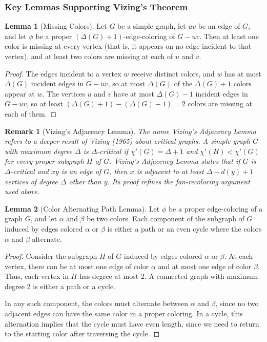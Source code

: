 \documentclass{article}
\newtheorem{remark}{Remark}
\theoremstyle{definition}
\newtheorem{lemma}{Lemma}
\begin{document}
\subsubsection{Key Lemmas Supporting Vizing's Theorem}

\begin{lemma}[Missing Colors]
Let $G$ be a simple graph, let $uv$ be an edge of $G$, and let $\phi$ be a proper $(\Delta(G) + 1)$-edge-coloring of $G - uv$. Then at least one color is missing at every vertex (that is, it appears on no edge incident to that vertex), and at least two colors are missing at each of $u$ and $v$.
\end{lemma}

\begin{proof}
The edges incident to a vertex $w$ receive distinct colors, and $w$ has at most $\Delta(G)$ incident edges in $G - uv$, so at most $\Delta(G)$ of the $\Delta(G) + 1$ colors appear at $w$. The vertices $u$ and $v$ have at most $\Delta(G) - 1$ incident edges in $G - uv$, so at least $(\Delta(G) + 1) - (\Delta(G) - 1) = 2$ colors are missing at each of them.
\end{proof}

\begin{remark}[Vizing's Adjacency Lemma]
The name \emph{Vizing's Adjacency Lemma} refers to a deeper result of Vizing (1965) about critical graphs. A simple graph $G$ with maximum degree $\Delta$ is \emph{$\Delta$-critical} if $\chi'(G) = \Delta + 1$ and $\chi'(H) < \chi'(G)$ for every proper subgraph $H$ of $G$. Vizing's Adjacency Lemma states that if $G$ is $\Delta$-critical and $xy$ is an edge of $G$, then $x$ is adjacent to at least $\Delta - d(y) + 1$ vertices of degree $\Delta$ other than $y$. Its proof refines the fan-recoloring argument used above.
\end{remark}

\begin{lemma}[Color Alternating Path Lemma]
Let $\phi$ be a proper edge-coloring of a graph $G$, and let $\alpha$ and $\beta$ be two colors. Each component of the subgraph of $G$ induced by edges colored $\alpha$ or $\beta$ is either a path or an even cycle where the colors $\alpha$ and $\beta$ alternate.
\end{lemma}

\begin{proof}
Consider the subgraph $H$ of $G$ induced by edges colored $\alpha$ or $\beta$. At each vertex, there can be at most one edge of color $\alpha$ and at most one edge of color $\beta$. Thus, each vertex in $H$ has degree at most 2. A connected graph with maximum degree 2 is either a path or a cycle. 

In any such component, the colors must alternate between $\alpha$ and $\beta$, since no two adjacent edges can have the same color in a proper coloring. In a cycle, this alternation implies that the cycle must have even length, since we need to return to the starting color after traversing the cycle.
\end{proof}
\end{document}
